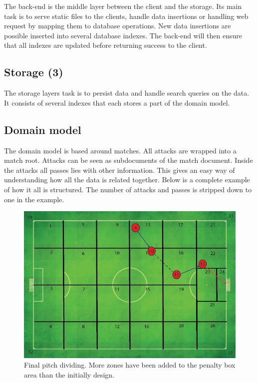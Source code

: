 The back-end is the middle layer between the client and the storage. Its main task is to serve static files to the clients, handle data insertions or handling web request by mapping them to database operations. New data insertions are possible inserted into several database indexes. The back-end will then ensure that all indexes are updated before returning success to the client. 

\subsection{Storage (3)}

The storage layers task is to persist data and handle search queries on the data. It consists of several indexes that each stores a part of the domain model. 

\subsection{Domain model}

The domain model is based around matches. All attacks are wrapped into a match root. Attacks can be seen as subdocuments of the match document. Inside the attacks all passes lies with other information. This gives an easy way of understanding how all the data is related together. Below is a complete example of how it all is structured. The number of attacks and passes is stripped down to one in the example.


\label{list:domainmodel}

\begin{figure}[ht!]
\centering
\includegraphics[width=1\textwidth]{images/general/capture_illustration.png}
\caption{Final pitch dividing. More zones have been added to the penalty box area than the initially design. }
\label{fig:finalPitchDividing}
\end{figure}

